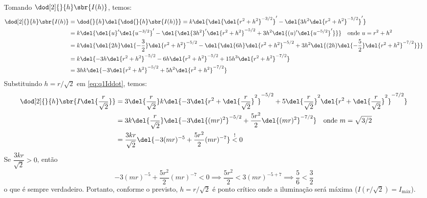 \documentclass[]{IMTexam}
\begin{document}
\begin{questions}
\begin{solution}
\begin{align*}
		\end{align*}
		Tomando $ \dod[2]{}{h}\sbr{I(h)} $, temos:
		\begin{align}
			\dod[2]{}{h}\sbr{I(h)} & =\dod{}{h}\del{\dod{}{h}\sbr{I(h)}}
			=k\del{\del{\del{r^{2}+h^{2}}^{-3/2}}'-\del{3h^{2}\del{r^{2}+h^{2}}^{-5/2}}'}                                                                                                   \nonumber         \\
			                       & =k\del{\del{u}'\del{u^{-3/2}}'-\del{\del{3h^{2}}'\del{r^{2}+h^{2}}^{-5/2}+3h^{2}\del{(u)'\del{u^{-5/2}}'}}}\quad\text{onde } u=r^{2}+h^{2}               \nonumber       \\
			                       & =k\del{\del{2h}\del{-\dfrac{3}{2}}\del{r^{2}+h^{2}}^{-5/2}-\del{\del{6h}\del{r^{2}+h^{2}}^{-5/2}+3h^{2}\del{(2h)\del{-\dfrac{5}{2}}\del{r^{2}+h^{2}}^{-7/2}}}} \nonumber \\
			                       & =k\del{-3h\del{r^{2}+h^{2}}^{-5/2}-6h\del{r^{2}+h^{2}}^{-5/2}+15h^{3}\del{r^{2}+h^{2}}^{-7/2}}                                                                \nonumber  \\
			                       & =3hk\del{-3\del{r^{2}+h^{2}}^{-5/2}+5h^{2}\del{r^{2}+h^{2}}^{-7/2}}\label{eq:q1Iddot}
		\end{align}
		Substituindo $ h=r/\sqrt{2} $ em \ref{eq:q1Iddot}, temos:
		\begin{align*}
			\dod[2]{}{h}\sbr{I\del{\dfrac{r}{\sqrt{2}}}} & =3\del{\dfrac{r}{\sqrt{2}}}k\del{-3\del{r^{2}+\del{\dfrac{r}{\sqrt{2}}}^{2}}^{-5/2}+5\del{\dfrac{r}{\sqrt{2}}}^{2}\del{r^{2}+\del{\dfrac{r}{\sqrt{2}}}^{2}}^{-7/2}} \\
			                                             & =3k\del{\dfrac{r}{\sqrt{2}}}\del{-3\del{(mr)^{2}}^{-5/2}+\dfrac{5r^{2}}{2}\del{(mr)^{2}}^{-7/2}}\quad\text{onde } m=\sqrt{3/2}                                      \\
			                                             & =\dfrac{3kr}{\sqrt{2}}\del{-3(mr)^{-5}+\dfrac{5r^{2}}{2}(mr)^{-7}}\overset{!}{<}0
		\end{align*}
		Se $ \dfrac{3kr}{\sqrt{2}}>0 $, então
		\[ -3(mr)^{-5}+\dfrac{5r^{2}}{2}(mr)^{-7}<0\implies\dfrac{5r^{2}}{2}<3(mr)^{-5+7}\implies\dfrac{5}{6}<\dfrac{3}{2} \]
		o que é sempre verdadeiro.
		Portanto, conforme o previsto, $ h=r/\sqrt{2} $ é ponto crítico onde a iluminação será máxima ($ I(r/\sqrt{2})=I_{\text{máx}} $).
	\end{solution}

	\clearpage


\end{questions}
\end{document}
